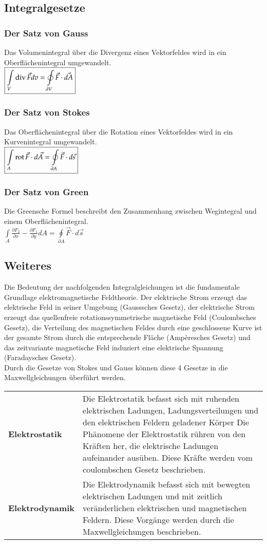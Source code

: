\subsection{Integralgesetze}
\subsubsection{Der Satz von Gauss}
Das Volumenintegral über die Divergenz eines Vektorfeldes wird in ein Oberflächenintegral umgewandelt.\\
$\boxed{\int\limits_V \operatorname{div} \vec F dv = \oint\limits_{\partial V} \vec F \cdot \vec{dA}}$
\subsubsection{Der Satz von Stokes}
Das Oberflächenintegral über die Rotation eines Vektorfeldes wird in ein Kurvenintegral umgewandelt. \\
$\boxed{\int\limits_A \operatorname{rot} \vec{F}\cdot d\vec{A}  = \oint\limits_{\partial A}\vec{F}\cdot d\vec{s}}$
\subsubsection{Der Satz von Green}
Die Greensche Formel beschreibt den Zusammenhang zwischen Wegintegral und einem Oberflächenintegral.\\
$\boxed{\int\limits_A \frac{\partial F_2}{\partial x} - \frac{\partial F_1}{\partial y} dA = \oint\limits_{\partial A}\vec{F}\cdot d\vec{s}}$
\subsection{Weiteres}
Die Bedeutung der nachfolgenden Integralgleichungen ist die fundamentale Grundlage elektromagnetische Feldtheorie. Der elektrische Strom erzeugt das elektrische Feld in seiner Umgebung (Gausssches Gesetz), der elektrische Strom erzeugt das quellenfreie rotationssymmetrische magnetische Feld (Coulombsches Gesetz), die Verteilung des magnetischen Feldes durch eine geschlossene Kurve ist der gesamte Strom durch die entsprechende Fläche (Ampèresches Gesetz) und das zeitvariante magnetische Feld induziert eine elektrische Spannung (Faradaysches Gesetz).\\
Durch die Gesetze von Stokes und Gauss können diese 4 Gesetze in die Maxwellgleichungen überführt werden. 
\vspace{-0.8cm}
\begin{longtable}{p{} p{}}
	\textbf{Elektrostatik} & Die Elektrostatik befasst sich mit ruhenden elektrischen Ladungen, Ladungsverteilungen und den elektrischen Feldern geladener Körper
	Die Phänomene der Elektrostatik rühren von den Kräften her, die elektrische Ladungen aufeinander ausüben. Diese Kräfte werden vom coulombschen Gesetz beschrieben.\\
	\textbf{Elektrodynamik} & Die Elektrodynamik befasst sich mit bewegten elektrischen Ladungen und mit zeitlich veränderlichen elektrischen und magnetischen Feldern. Diese Vorgänge werden durch die Maxwellgleichungen beschrieben. \\
\end{longtable}
